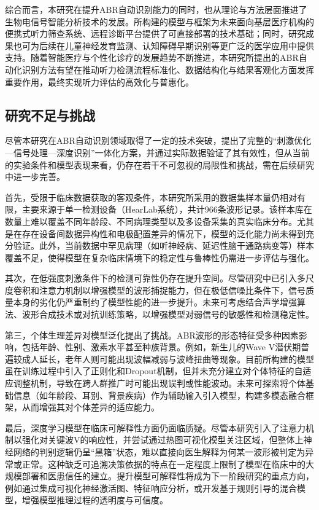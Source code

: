 综合而言，本研究在提升ABR自动识别能力的同时，也从理论与方法层面推进了生物电信号智能分析技术的发展。所构建的模型与框架为未来面向基层医疗机构的便携式听力筛查系统、远程诊断平台提供了可直接部署的技术基础；同时，研究成果也可为后续在儿童神经发育监测、认知障碍早期识别等更广泛的医学应用中提供支持。随着智能医疗与个性化诊疗的发展趋势不断推进，本研究所提出的ABR自动化识别方法有望在推动听力检测流程标准化、数据结构化与结果客观化方面发挥重要作用，最终实现听力评估的高效化与普惠化。

\subsection*{研究不足与挑战}

尽管本研究在ABR自动识别领域取得了一定的技术突破，提出了完整的“刺激优化—信号处理—深度识别”一体化方案，并通过实际数据验证了其有效性，但从当前的实验条件和模型表现来看，仍存在若干不可忽视的局限性和挑战，需在后续研究中进一步完善。

首先，受限于临床数据获取的客观条件，本研究所采用的数据集样本量仍相对有限，主要来源于单一检测设备（HearLab系统），共计966条波形记录。该样本库在数量上难以覆盖不同年龄段、不同病理类型以及多设备采集的真实临床分布。尤其是在存在设备间数据异构性和电极配置差异的情况下，模型的泛化能力尚未得到充分验证。此外，当前数据中罕见病理（如听神经病、延迟性脑干通路病变等）样本覆盖不足，使得模型在复杂临床情境下的稳定性与鲁棒性仍需进一步评估与强化。

其次，在低强度刺激条件下的检测可靠性仍存在提升空间。尽管研究中已引入多尺度卷积和注意力机制以增强模型的波形捕捉能力，但在极低信噪比条件下，信号质量本身的劣化仍严重制约了模型性能的进一步提升。未来可考虑结合声学增强算法、波形合成技术或对抗训练策略，以增强模型对弱信号的敏感性和检测稳定性。

第三，个体生理差异对模型泛化提出了挑战。ABR波形的形态特征受多种因素影响，包括年龄、性别、激素水平甚至种族背景。例如，新生儿的Wave V潜伏期普遍较成人延长，老年人则可能出现波幅减弱与波峰扭曲等现象。目前所构建的模型虽在训练过程中引入了正则化和Dropout机制，但并未充分建立对个体特征的自适应调整机制，导致在跨人群推广时可能出现误判或性能波动。未来可探索将个体基础信息（如年龄段、耳别、背景疾病）作为辅助输入引入模型，构建多模态融合框架，从而增强其对个体差异的适应能力。

最后，深度学习模型在临床可解释性方面仍面临质疑。尽管本研究引入了注意力机制以强化对关键波V的响应性，并尝试通过热图可视化模型关注区域，但整体上神经网络的判别逻辑仍呈“黑箱”状态，难以直接向医生解释为何某一波形被判定为异常或正常。这种缺乏可追溯决策依据的特点在一定程度上限制了模型在临床中的大规模部署和医患信任的建立。提升模型可解释性将成为下一阶段研究的重点方向，例如通过集成可视化神经激活图、特征响应分析，或开发基于规则引导的混合模型，增强模型推理过程的透明度与可信度。

